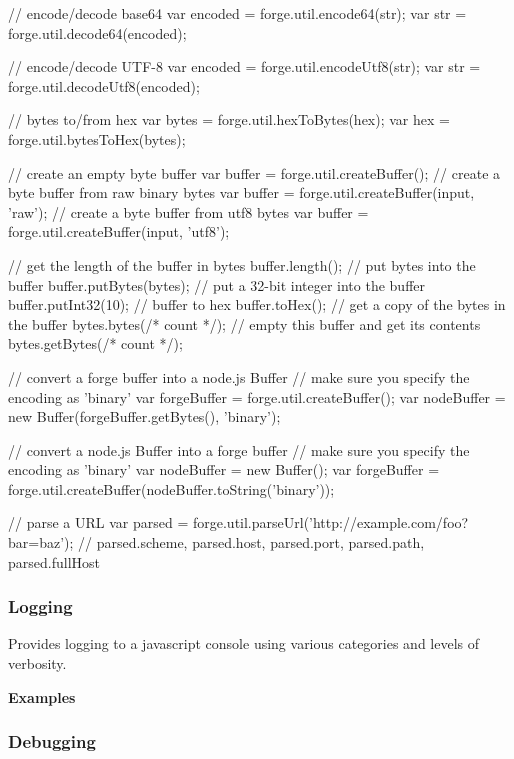 \begin{DoxyCode}
// encode/decode base64
var encoded = forge.util.encode64(str);
var str = forge.util.decode64(encoded);

// encode/decode UTF-8
var encoded = forge.util.encodeUtf8(str);
var str = forge.util.decodeUtf8(encoded);

// bytes to/from hex
var bytes = forge.util.hexToBytes(hex);
var hex = forge.util.bytesToHex(bytes);

// create an empty byte buffer
var buffer = forge.util.createBuffer();
// create a byte buffer from raw binary bytes
var buffer = forge.util.createBuffer(input, 'raw');
// create a byte buffer from utf8 bytes
var buffer = forge.util.createBuffer(input, 'utf8');

// get the length of the buffer in bytes
buffer.length();
// put bytes into the buffer
buffer.putBytes(bytes);
// put a 32-bit integer into the buffer
buffer.putInt32(10);
// buffer to hex
buffer.toHex();
// get a copy of the bytes in the buffer
bytes.bytes(/* count */);
// empty this buffer and get its contents
bytes.getBytes(/* count */);

// convert a forge buffer into a node.js Buffer
// make sure you specify the encoding as 'binary'
var forgeBuffer = forge.util.createBuffer();
var nodeBuffer = new Buffer(forgeBuffer.getBytes(), 'binary');

// convert a node.js Buffer into a forge buffer
// make sure you specify the encoding as 'binary'
var nodeBuffer = new Buffer();
var forgeBuffer = forge.util.createBuffer(nodeBuffer.toString('binary'));

// parse a URL
var parsed = forge.util.parseUrl('http://example.com/foo?bar=baz');
// parsed.scheme, parsed.host, parsed.port, parsed.path, parsed.fullHost
\end{DoxyCode}


\label{_log}%
 \subsubsection*{Logging}

Provides logging to a javascript console using various categories and levels of verbosity.

{\bfseries Examples}


\begin{DoxyCode}
\end{DoxyCode}


\label{_debug}%
 \subsubsection*{Debugging}

